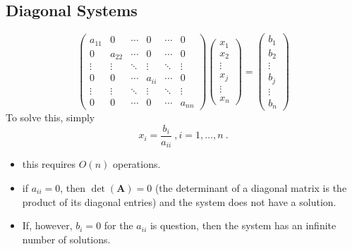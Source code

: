 \documentclass[12pt]{article}
\newcommand{\ve}[1]{\ensuremath{\mathbf{#1}}}
\begin{document}
\subsection*{Diagonal Systems}
\begin{equation}
   \begin{pmatrix}
      a_{11} & 0      & \cdots & 0      & \cdots & 0 \\
      0      & a_{22} & \cdots & 0      & \cdots & 0 \\
      \vdots & \vdots & \ddots & \vdots & \ddots & \vdots \\     
      0      & 0      & \cdots & a_{ii} & \cdots & 0 \\
      \vdots & \vdots & \ddots & \vdots & \ddots & \vdots \\
      0      & 0      & \cdots & 0      & \cdots & a_{nn} 
    \end{pmatrix} 
    \begin{pmatrix} x_1 \\ x_2 \\ \vdots \\ x_j \\ \vdots \\ x_n \end{pmatrix} =
    \begin{pmatrix} b_1 \\ b_2 \\ \vdots \\ b_j \\ \vdots \\ b_n \end{pmatrix}
    \nonumber   
\end{equation} 
%
To solve this, simply
%
\[x_i = \frac{b_i}{a_{ii}} \:, i=1,\dots,n\:.\]
%
\begin{itemize}
\item this requires $O(n)$ operations.
\item if $a_{ii}=0$, then $\det(\ve{A})=0$ (the determinant of a diagonal matrix is the product of its diagonal entries) and the system does not have a solution.
\item If, however, $b_i = 0$ for the $a_{ii}$ is question, then the system has an infinite number of solutions.
\end{itemize}

\end{document}
